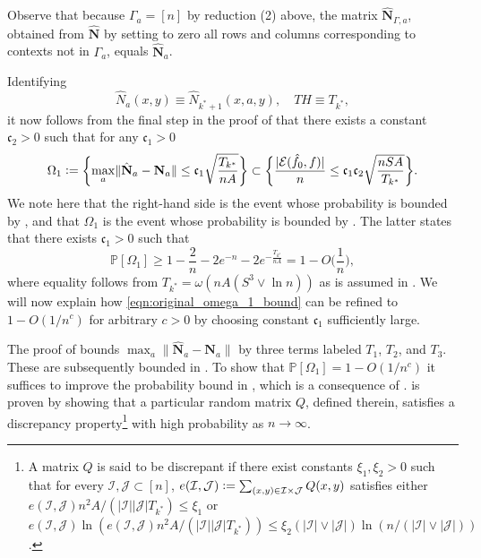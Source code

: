 \documentclass[11pt]{article}
\newcommand{\eqdef}{\vcentcolon=}
\newcommand{\mf}[1]{\mathfrak{#1}}
\newcommand{\mbf}[1]{\mathbf{#1}}
\newcommand{\mcE}{\mathcal{E}}
\newcommand{\mcI}{\mathcal{I}}
\newcommand{\mcJ}{\mathcal{J}}
\newcommand{\mbbP}{\mathbb{P}}
\theoremstyle{definition}
\theoremstyle{definition}
\begin{document}
Observe that because $\Gamma_a=[n]$ by reduction (2) above, the matrix $\hat{\mbf{N}}_{\Gamma,a}$, obtained from $\hat{\mbf{N}}$ by setting to zero all rows and columns corresponding to contexts not in $\Gamma_a$, equals $\hat{\mbf{N}}_a$.

Identifying
\begin{equation}
	\label{eqn:identifications_with_jedra}
	\hat{N}_a(x,y)\equiv \hat{N}_{k^*+1}(x,a,y)
	,
	\quad
	TH \equiv T_{k^*}
	,
\end{equation}
it now follows from the final step in the proof of \cite[Theorem 11]{Jedra:2022} that there exists a constant $\mf{c}_2>0$ such that for any $\mf{c}_1>0$
\begin{equation}
	\label{eqn:refined_spectral_norm_bound}
	\Omega_1
	\eqdef \biggl\{
	\max_{a}
	\lVert \hat{\mbf{N}}_a-\mbf{N}_a\rVert \leq \mf{c}_1\sqrt{\frac{T_{k^*}}{nA}}
	\biggr\}
	\subset
	\biggl\{
	\frac{|\mcE(\hat{f}_{0},f)|}{n}
	\leq
	\mf{c}_1\mf{c}_2\sqrt{\frac{nSA}{T_{k^*}}}
	\biggr\}
	.
\end{equation}
We note here that the right-hand side is the event whose probability is bounded by \cite[Theorem 2]{Jedra:2022}, and that $\Omega_1$ is the event whose probability is bounded by \cite[Proposition 19]{Jedra:2022}.
The latter states that there exists $\mf{c}_1>0$ such that \begin{equation}
	\label{eqn:original_omega_1_bound}
	\mbbP[\Omega_1]
	\geq
	1-\frac{2}{n}-2e^{-n}-2e^{-\frac{T_{k^*}}{nA}}
	=
	1-O\biggl(\frac{1}{n}\biggr),
\end{equation}
where equality follows from $T_{k^*}=\omega(nA(S^3\vee \ln n))$ as is assumed in .
We will now explain how \eqref{eqn:original_omega_1_bound} can be refined to $1-O(1/n^c)$ for arbitrary $c>0$ by choosing constant $\mf{c}_1$ sufficiently large.

The proof of \cite[Proposition 19]{Jedra:2022} bounds $\max_{a}\lVert \hat{\mbf{N}}_a-\mbf{N}_a\rVert$ by three terms labeled $T_1$, $T_2$, and $T_3$.
These are subsequently bounded in \cite[(75)--(77)]{Jedra:2022}.
To show that $\mbbP[\Omega_1]=1-O(1/n^c)$ it suffices to improve the probability bound in \cite[(77)]{Jedra:2022}, which is a consequence of \cite[Lemma 18]{Jedra:2022}.
\cite[Lemma 18]{Jedra:2022} is proven by showing that a particular random matrix $Q$, defined therein, satisfies a discrepancy property\footnote{
	A matrix $Q$ is said to be discrepant if there exist constants $\xi_1,\xi_2>0$ such that for every $\mathcal{I},\mathcal{J}\subset[n]$, $e(\mcI,\mcJ)\eqdef \sum_{(x,y)\in \mathcal{I}\times\mathcal{J}} Q(x,y)$ satisfies either $e(\mcI,\mcJ)n^2A/(|\mcI||\mcJ|T_{k^*})\leq \xi_1$ or $e(\mcI,\mcJ)\ln(e(\mcI,\mcJ)n^2A/(|\mcI||\mcJ|T_{k^*}))\leq \xi_2(|\mcI|\vee|\mcJ|)\ln(n/(|\mcI|\vee|\mcJ|))$.
}
with high probability as $n\rightarrow \infty$.
\end{document}
